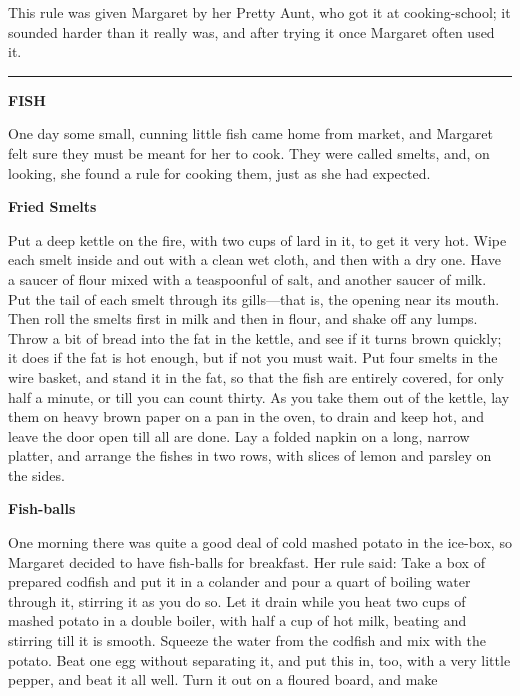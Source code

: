 \documentclass[11pt]{book}
\newcommand{\hstroke}{\rule[0.5ex]{5.0em}{0.2ex}}
\newcommand{\indpar}{\par\noindent\hspace*{\parindent}}
\newcommand{\instruction}{\indpar}
\newenvironment{RecipeTitle}{\medskip\begin{center}\large\bf }{\end{center}\smallskip}
\newenvironment{FoodTypeTitle}{\begin{center}\large\bf }{\end{center}}
\begin{document}
This rule was given Margaret by her Pretty Aunt, who got it at
cooking-school; it sounded harder than it really was, and after
trying it once Margaret often used it.
\bigskip
\begin{center}
\hstroke
\end{center}\pagebreak[2]
\begin{FoodTypeTitle}
FISH\label{FISH}
\end{FoodTypeTitle}
\indpar
  One day some small, cunning little fish came home from market,
and Margaret felt sure they must be meant for her to cook.  They
were called smelts, and, on looking, she found a rule for cooking
them, just as she had expected.
\begin{RecipeTitle}
Fried Smelts\label{fried_smelts}
\end{RecipeTitle}
\instruction
  Put a deep kettle on the fire, with two cups of lard in it, to
get it very hot.  Wipe each smelt inside and out with a clean wet
cloth, and then with a dry one.  Have a saucer of flour mixed
with a teaspoonful of salt, and another saucer of milk.  Put the
tail of each smelt through its gills---that is, the opening near
its mouth.  Then roll the smelts first in milk and then in flour,
and shake off any lumps.  Throw a bit of bread into the fat in the
kettle, and see if it turns brown quickly; it does if the fat is
hot enough, but if not you must wait.  Put four smelts in the wire
basket, and stand it in the fat, so that the fish are entirely
covered, for only half a minute, or till you can count thirty.
As you take them out of the kettle, lay them on heavy brown paper
on a pan in the oven, to drain and keep hot, and leave the door
open till all are done.  Lay a folded napkin on a long, narrow
platter, and arrange the fishes in two rows, with slices of lemon
and parsley on the sides.
\begin{RecipeTitle}
Fish-balls\label{fish_balls}
\end{RecipeTitle}
\instruction
  One morning there was quite a good deal of cold mashed potato
in the ice-box, so Margaret decided to have fish-balls for
breakfast.  Her rule said:  Take a box of prepared codfish and
put it in a colander and pour a quart of boiling water through
it, stirring it as you do so.  Let it drain while you heat two
cups of mashed potato in a double boiler, with half a cup of hot
milk, beating and stirring till it is smooth.  Squeeze the water
from the codfish and mix with the potato.  Beat one egg without
separating it, and put this in, too, with a very little pepper,
and beat it all well.  Turn it out on a floured board, and make
\end{document}
